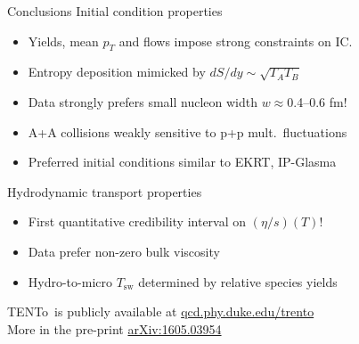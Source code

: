 \documentclass[xcolor=dvipsnames]{beamer}
\newcommand{\trento}{T\raisebox{-0.3ex}{R}ENTo}
\begin{document}
\begin{frame}[plain]{Conclusions}
\medskip
Initial condition properties
\begin{itemize}
    \item Yields, mean $p_T$ and flows impose strong constraints on IC. \\
    \item Entropy  deposition mimicked by $dS/dy \sim \sqrt{T_A T_B}$ \\
    \item Data strongly prefers small nucleon width $w \approx {}$0.4--0.6 fm! \\
    \item A+A collisions weakly sensitive to p+p mult.\ fluctuations \\
    \item Preferred initial conditions similar to EKRT, IP-Glasma \\
\end{itemize}
\smallskip
Hydrodynamic transport properties
\begin{itemize}
    \item First quantitative credibility interval on $(\eta/s)(T)$!
    \item Data prefer non-zero bulk viscosity
    \item Hydro-to-micro $T_\text{sw}$ determined by relative species yields 
\end{itemize}
\medskip \centering
\trento\ is publicly available at \textcolor{pyblue}{\url{qcd.phy.duke.edu/trento}} \\
\medskip More in the pre-print \textcolor{pyblue}{\url{arXiv:1605.03954}}
\end{frame}

\appendix
\end{document}
